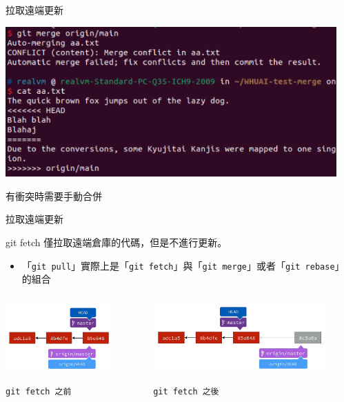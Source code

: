 \documentclass[xetex, unicode, 10pt, aspectratio=169]{beamer}
\begin{document}
\begin{frame}{拉取遠端更新}
    \begin{center}
        \includegraphics[width=5in]{./img/git-pull-merge.png}

        有衝突時需要手動合併
    \end{center}
\end{frame}

\begin{frame}{拉取遠端更新}
    \begin{block}{git fetch}
        僅拉取遠端倉庫的代碼，但是不進行更新。
        \begin{itemize}
            \item 「\texttt{git pull}」實際上是「\texttt{git
                fetch}」與「\texttt{git merge}」或者「\texttt{git rebase}」的組合
        \end{itemize}
        \begin{columns}
            \begin{column}{0.5\textwidth}
                \begin{center}
                    \includegraphics[height=1in]{./img/git-before-fetch.png}

                    \texttt{git fetch 之前}
                \end{center}
            \end{column}

            \begin{column}{0.5\textwidth}
                \begin{center}
                    \includegraphics[height=1in]{./img/git-after-fetch.png}

                    \texttt{git fetch 之後}
                \end{center}
            \end{column}
        \end{columns}
    \end{block}
\end{frame}
\end{document}
